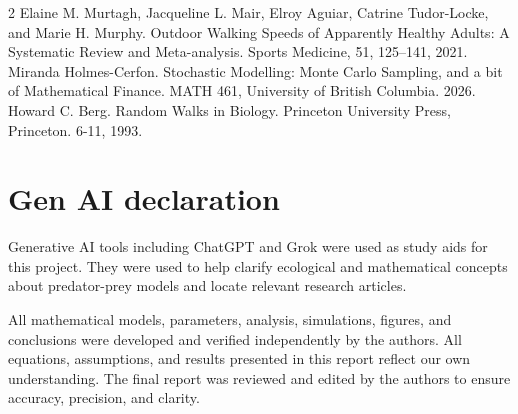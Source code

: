 \documentclass{article}
\begin{document}
\begin{thebibliography}{2} %
Elaine M. Murtagh, Jacqueline L. Mair, Elroy Aguiar, Catrine Tudor-Locke, and Marie H. Murphy. Outdoor Walking Speeds of Apparently Healthy Adults: A Systematic Review and Meta-analysis. Sports Medicine, 51, 125–141, 2021.
Miranda Holmes-Cerfon. Stochastic Modelling: Monte Carlo Sampling, and a bit of  Mathematical Finance. MATH 461, University of British Columbia. 2026.
Howard C. Berg. Random Walks in Biology. Princeton University Press, Princeton. 6-11, 1993.

\end{thebibliography}
\newpage

\section*{Gen AI declaration} 
Generative AI tools including ChatGPT and Grok were used as study aids for this project. They were used to help clarify ecological and mathematical concepts about predator-prey models and locate relevant research articles.

\vspace{5mm}

\noindent All mathematical models, parameters, analysis, simulations, figures, and conclusions were developed and verified independently by the authors. All equations, assumptions, and results presented in this report reflect our own understanding. The final report was reviewed and edited by the authors to ensure accuracy, precision, and clarity.
\end{document}
